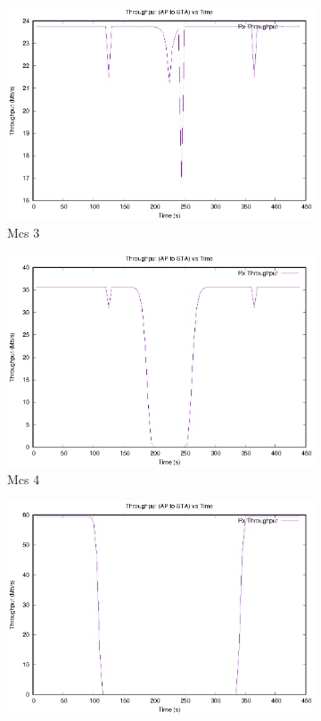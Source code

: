 \documentclass[12]{article}
\begin{document}
\begin{figure}[!htb]
\begin{subfigure}{.4\textwidth}
  \includegraphics[width=\linewidth]{"20Mhz_Long_1SS_0AU/CR_HtMcs3/DistanceThroughput"}
  \caption{Mcs 3}
  \label{fig:20_3_tt}
\end{subfigure}%
\begin{subfigure}{.4\textwidth}
  \includegraphics[width=\linewidth]{"20Mhz_Long_1SS_0AU/CR_HtMcs4/DistanceThroughput"}
  \caption{Mcs 4}
  \label{fig:20_4_tt}
\end{subfigure}%
\begin{subfigure}{.4\textwidth}
  \includegraphics[width=\linewidth]{"20Mhz_Long_1SS_0AU/CR_HtMcs7/DistanceThroughput"}

\end{subfigure}
\end{figure}
\end{document}
